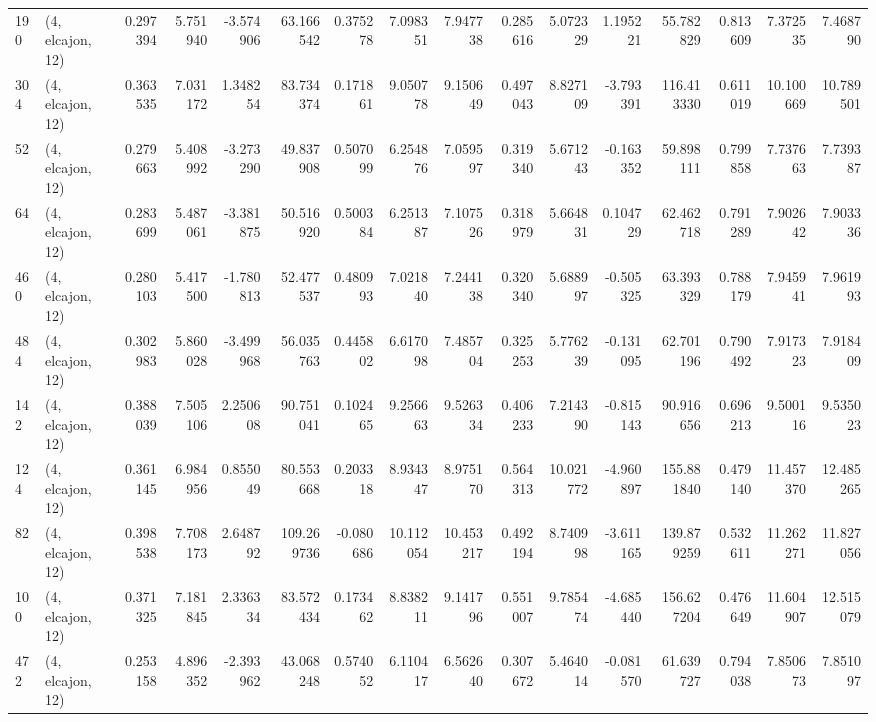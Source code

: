 \begin{tabular}{llrrrrrrrrrrrrrr}
190 &  (4, elcajon, 12) &   0.297394 &   5.751940 &  -3.574906 &    63.166542 &   0.375278 &   7.098351 &   7.947738 &  0.285616 &   5.072329 &   1.195221 &    55.782829 &  0.813609 &   7.372535 &   7.468790 \\
304 &  (4, elcajon, 12) &   0.363535 &   7.031172 &   1.348254 &    83.734374 &   0.171861 &   9.050778 &   9.150649 &  0.497043 &   8.827109 &  -3.793391 &   116.413330 &  0.611019 &  10.100669 &  10.789501 \\
52  &  (4, elcajon, 12) &   0.279663 &   5.408992 &  -3.273290 &    49.837908 &   0.507099 &   6.254876 &   7.059597 &  0.319340 &   5.671243 &  -0.163352 &    59.898111 &  0.799858 &   7.737663 &   7.739387 \\
64  &  (4, elcajon, 12) &   0.283699 &   5.487061 &  -3.381875 &    50.516920 &   0.500384 &   6.251387 &   7.107526 &  0.318979 &   5.664831 &   0.104729 &    62.462718 &  0.791289 &   7.902642 &   7.903336 \\
460 &  (4, elcajon, 12) &   0.280103 &   5.417500 &  -1.780813 &    52.477537 &   0.480993 &   7.021840 &   7.244138 &  0.320340 &   5.688997 &  -0.505325 &    63.393329 &  0.788179 &   7.945941 &   7.961993 \\
484 &  (4, elcajon, 12) &   0.302983 &   5.860028 &  -3.499968 &    56.035763 &   0.445802 &   6.617098 &   7.485704 &  0.325253 &   5.776239 &  -0.131095 &    62.701196 &  0.790492 &   7.917323 &   7.918409 \\
142 &  (4, elcajon, 12) &   0.388039 &   7.505106 &   2.250608 &    90.751041 &   0.102465 &   9.256663 &   9.526334 &  0.406233 &   7.214390 &  -0.815143 &    90.916656 &  0.696213 &   9.500116 &   9.535023 \\
124 &  (4, elcajon, 12) &   0.361145 &   6.984956 &   0.855049 &    80.553668 &   0.203318 &   8.934347 &   8.975170 &  0.564313 &  10.021772 &  -4.960897 &   155.881840 &  0.479140 &  11.457370 &  12.485265 \\
82  &  (4, elcajon, 12) &   0.398538 &   7.708173 &   2.648792 &   109.269736 &  -0.080686 &  10.112054 &  10.453217 &  0.492194 &   8.740998 &  -3.611165 &   139.879259 &  0.532611 &  11.262271 &  11.827056 \\
100 &  (4, elcajon, 12) &   0.371325 &   7.181845 &   2.336334 &    83.572434 &   0.173462 &   8.838211 &   9.141796 &  0.551007 &   9.785474 &  -4.685440 &   156.627204 &  0.476649 &  11.604907 &  12.515079 \\
472 &  (4, elcajon, 12) &   0.253158 &   4.896352 &  -2.393962 &    43.068248 &   0.574052 &   6.110417 &   6.562640 &  0.307672 &   5.464014 &  -0.081570 &    61.639727 &  0.794038 &   7.850673 &   7.851097 \\

\end{tabular}
